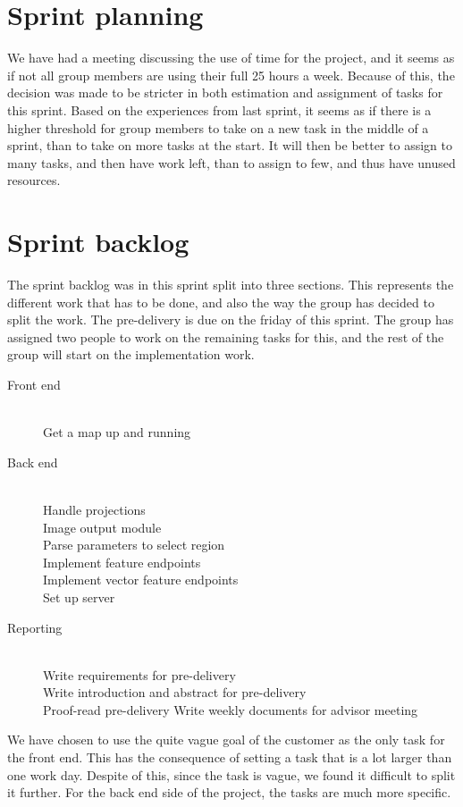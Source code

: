\documentclass[11pt,a4paper,titlepage,oneside]{report}
\begin{document}
\section{Sprint planning}
We have had a meeting discussing the use of time for the project, and it seems as if not all group members are using their full 25 hours a week. Because of this, the decision was made to be stricter in both estimation and assignment of tasks for this sprint. Based on the experiences from last sprint, it seems as if there is a higher threshold for group members to take on a new task in the middle of a sprint, than to take on more tasks at the start. It will then be better to assign to many tasks, and then have work left, than to assign to few, and thus have unused resources. 

\section{Sprint backlog}
The sprint backlog was in this sprint split into three sections. This represents the different work that has to be done, and also the way the group has decided to split the work. The pre-delivery is due on the friday of this sprint. The group has assigned two people to work on the remaining tasks for this, and the rest of the group will start on the implementation work. 

\begin{description}
	\item[Front end] \hfill \\
	Get a map up and running
	\item[Back end] \hfill \\
	Handle projections \hfill \\
	Image output module \hfill \\
	Parse parameters to select region \hfill \\
	Implement feature endpoints \hfill \\
	Implement vector feature endpoints \hfill \\
	Set up server
	\item[Reporting] \hfill \\ 
	Write requirements for pre-delivery \hfill \\
	Write introduction and abstract for pre-delivery \hfill \\
	Proof-read pre-delivery 
	Write weekly documents for advisor meeting
\end{description}
	
We have chosen to use the quite vague goal of the customer as the only task for the front end. This has the consequence of setting a task that is a lot larger than one work day. Despite of this, since the task is vague, we found it difficult to split it further. For the back end side of the project, the tasks are much more specific.
\end{document}
